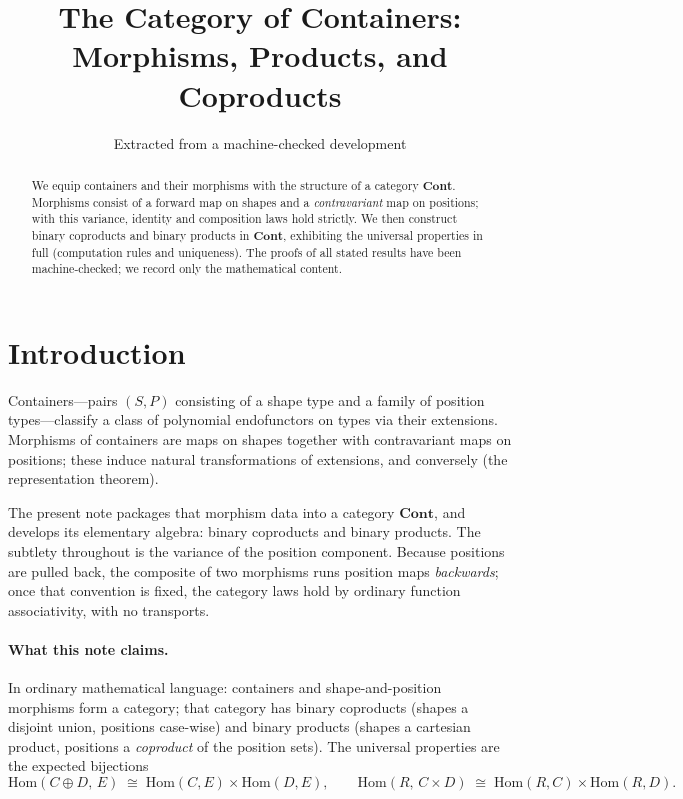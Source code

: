 \documentclass[11pt,a4paper]{article}
\title{The Category of Containers:\\
  Morphisms, Products, and Coproducts}
\author{Extracted from a machine-checked development}
\date{}
\theoremstyle{plain}
\theoremstyle{definition}
\newcommand{\Cont}{\mathbf{Cont}}
\newcommand{\Hom}{\mathrm{Hom}}
\begin{document}
\maketitle

\begin{abstract}
We equip containers and their morphisms with the structure of a category
$\Cont$. Morphisms consist of a forward map on shapes and a \emph{contravariant}
map on positions; with this variance, identity and composition laws hold
strictly. We then construct binary coproducts and binary products in $\Cont$,
exhibiting the universal properties in full (computation rules and uniqueness).
The proofs of all stated results have been machine-checked; we record only the
mathematical content.
\end{abstract}

\tableofcontents
\bigskip

\section{Introduction}

Containers---pairs $(S,P)$ consisting of a shape type and a family of position
types---classify a class of polynomial endofunctors on types via their
extensions. Morphisms of containers are maps on shapes together with
contravariant maps on positions; these induce natural transformations of
extensions, and conversely (the representation theorem).

The present note packages that morphism data into a category $\Cont$, and
develops its elementary algebra: binary coproducts and binary products. The
subtlety throughout is the variance of the position component. Because
positions are pulled back, the composite of two morphisms runs position maps
\emph{backwards}; once that convention is fixed, the category laws hold by
ordinary function associativity, with no transports.

\paragraph{What this note claims.}
In ordinary mathematical language: containers and shape-and-position morphisms
form a category; that category has binary coproducts (shapes a disjoint union,
positions case-wise) and binary products (shapes a cartesian product, positions
a \emph{coproduct} of the position sets). The universal properties are the
expected bijections
\[
  \Hom(C\oplus D,\,E)
  \;\cong\;
  \Hom(C,E)\times\Hom(D,E),
  \qquad
  \Hom(R,\,C\times D)
  \;\cong\;
  \Hom(R,C)\times\Hom(R,D).
\]
\end{document}
